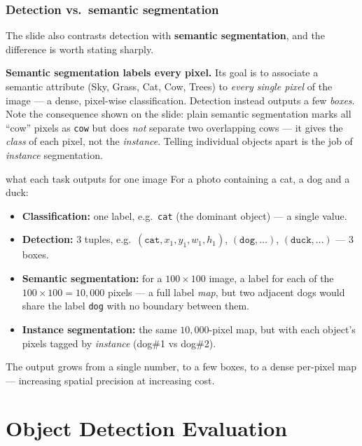 \documentclass{report}
\begin{document}
\subsection{Detection vs.\ semantic segmentation}

The slide also contrasts detection with \textbf{semantic segmentation}, and the
difference is worth stating sharply.

\begin{keybox}
\textbf{Semantic segmentation labels every pixel.} Its goal is to associate a
semantic attribute (Sky, Grass, Cat, Cow, Trees) to \emph{every single pixel}
of the image --- a dense, pixel-wise classification. Detection instead outputs a
few \emph{boxes}. Note the consequence shown on the slide: plain semantic
segmentation marks all ``cow'' pixels as \texttt{cow} but does \emph{not}
separate two overlapping cows --- it gives the \emph{class} of each pixel, not
the \emph{instance}. Telling individual objects apart is the job of
\emph{instance} segmentation.
\end{keybox}

\begin{exbox}{what each task outputs for one image}
For a photo containing a cat, a dog and a duck:
\begin{itemize}
\item \textbf{Classification:} one label, e.g.\ \texttt{cat} (the dominant
object) --- a single value.
\item \textbf{Detection:} $3$ tuples, e.g.\
$(\texttt{cat},x_1,y_1,w_1,h_1)$, $(\texttt{dog},\dots)$,
$(\texttt{duck},\dots)$ --- $3$ boxes.
\item \textbf{Semantic segmentation:} for a $100\times100$ image, a label for
each of the $100\times100 = 10{,}000$ pixels --- a full label \emph{map}, but
two adjacent dogs would share the label \texttt{dog} with no boundary between
them.
\item \textbf{Instance segmentation:} the same $10{,}000$-pixel map, but with
each object's pixels tagged by \emph{instance} (dog\#1 vs dog\#2).
\end{itemize}
The output grows from a single number, to a few boxes, to a dense per-pixel map
--- increasing spatial precision at increasing cost.
\end{exbox}




\chapter{Object Detection Evaluation}
\end{document}
